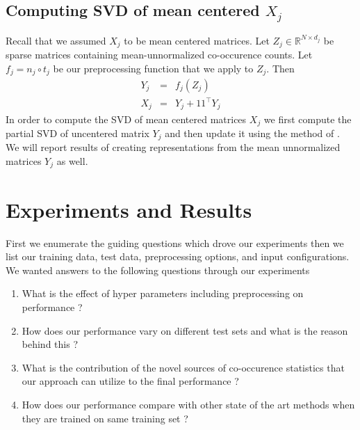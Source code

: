 \documentclass[11pt]{article}
\begin{document}
\subsection{Computing SVD of mean centered $X_j$}
\label{ssec:svdmc}
Recall that we assumed $X_j$ to be mean centered matrices. Let $Z_j
\in \mathbb{R}^{N \times d_j}$ be sparse matrices containing
mean-unnormalized co-occurence counts. Let $f_j = n_j \circ t_j $ be our preprocessing
function that we apply to $Z_j$. Then
\begin{eqnarray}
  Y_j &=& f_j (Z_j) \\
  X_j &=& Y_j + 1 1^\top Y_j
\end{eqnarray}
In order to compute the SVD of mean centered matrices $X_j$ we first
compute the partial SVD of uncentered 
matrix $Y_j$ and then update it using the method of
\cite{brand2006fast}.
We will report results of creating representations from the mean
unnormalized matrices $Y_j$ as well.

\section{Experiments and Results}
\label{sec:experiments}
First we enumerate the guiding questions which drove our
experiments then we list our training data, test data, preprocessing
options, and input configurations.
We wanted answers to the following questions through our experiments
\begin{enumerate}
\item What is the effect of hyper parameters including preprocessing
  on performance ?
\item How does our performance vary on different test sets and what is
  the reason behind this ?
\item What is the contribution of the novel sources of co-occurence
  statistics that our approach can utilize to the final performance ?
\item How does our performance compare with other state of the art
  methods when they are trained on same training set ?
\end{enumerate}
\end{document}
